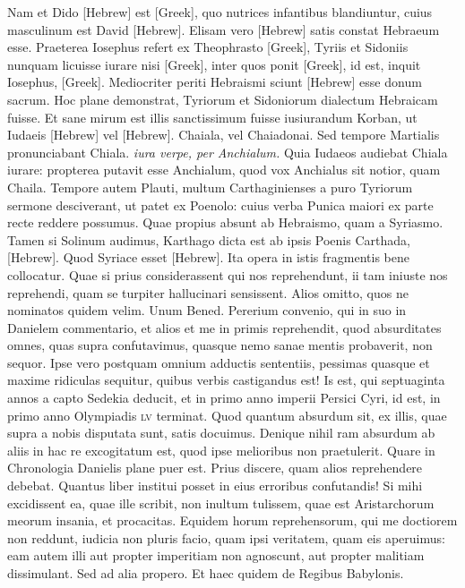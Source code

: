 Nam et Dido \texthebrew{[Hebrew]} est \textgreek{[Greek]},
 quo nutrices
infantibus blandiuntur, cuius masculinum est David \texthebrew{[Hebrew]}.
Elisam
vero \texthebrew{[Hebrew]} satis constat Hebraeum esse.
Praeterea Iosephus refert
ex Theophrasto \textgreek{[Greek]}, Tyriis et Sidoniis nunquam licuisse
iurare nisi \textgreek{[Greek]},
 inter quos ponit \textgreek{[Greek]}, id est, inquit
Iosephus, \textgreek{[Greek]}.
Mediocriter periti Hebraismi sciunt \texthebrew{[Hebrew]} esse
donum sacrum.
Hoc plane demonstrat, Tyriorum et Sidoniorum
dialectum Hebraicam fuisse.
Et sane mirum est illis sanctissimum
fuisse iusiurandum Korban, ut Iudaeis
 \texthebrew{[Hebrew]} vel \texthebrew{[Hebrew]}.
Chaiala,
vel Chaiadonai.
Sed tempore Martialis pronunciabant Chiala.
\textit{iura verpe, per Anchialum.}
Quia Iudaeos audiebat Chiala iurare:
propterea putavit esse Anchialum, quod vox Anchialus sit notior,
quam Chaila.
Tempore autem Plauti, multum Carthaginienses
a puro Tyriorum sermone desciverant, ut patet ex Poenolo:
cuius verba Punica maiori ex parte recte reddere possumus.
Quae propius absunt ab Hebraismo, quam a Syriasmo.
Tamen
si Solinum audimus, Karthago dicta est ab ipsis Poenis Carthada,
\texthebrew{[Hebrew]}.
Quod Syriace esset \texthebrew{[Hebrew]}.
Ita opera in istis fragmentis
bene collocatur.
Quae si prius considerassent qui nos reprehendunt,
ii tam iniuste nos reprehendi, quam se turpiter hallucinari
sensissent.
Alios omitto, quos ne nominatos quidem velim.
Unum Bened.
Pererium convenio, qui in suo in Danielem commentario,
et alios et me in primis reprehendit, quod absurditates
omnes, quas supra confutavimus, quasque nemo sanae mentis
probaverit, non sequor.
Ipse vero postquam omnium adductis sententiis,
pessimas quasque et maxime ridiculas sequitur, quibus verbis
castigandus est!
Is est, qui septuaginta annos a capto Sedekia
deducit, et in primo anno imperii Persici Cyri, id est, in primo
anno Olympiadis \textsc{lv} terminat.
Quod quantum absurdum sit, ex
illis, quae supra a nobis disputata sunt, satis docuimus.
Denique
nihil ram absurdum ab aliis in hac re excogitatum est, quod ipse
melioribus non praetulerit.
Quare in Chronologia Danielis plane
puer est.
Prius discere, quam alios reprehendere debebat.
Quantus liber institui posset in eius erroribus confutandis!
Si mihi excidissent
ea, quae ille scribit, non inultum tulissem, quae est Aristarchorum
meorum insania, et procacitas.
Equidem horum reprehensorum,
qui me doctiorem non reddunt, iudicia non pluris
facio, quam ipsi veritatem, quam eis aperuimus: eam autem illi aut
propter imperitiam non agnoscunt, aut propter malitiam dissimulant.
Sed ad alia propero.
Et haec quidem de Regibus Babylonis.

